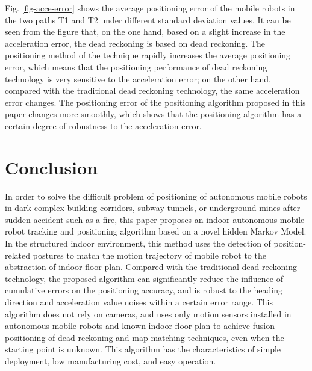 \documentclass{llncs}
\begin{document}
Fig. \ref{fig-acce-error} shows the average positioning error of the mobile robots in the two paths T1 and T2 under different standard deviation values. It can be seen from the figure that, on the one hand, based on a slight increase in the acceleration error, the dead reckoning is based on dead reckoning. The positioning method of the technique rapidly increases the average positioning error, which means that the positioning performance of dead reckoning technology is very sensitive to the acceleration error; on the other hand, compared with the traditional dead reckoning technology, the same acceleration error changes. The positioning error of the positioning algorithm proposed in this paper changes more smoothly, which shows that the positioning algorithm has a certain degree of robustness to the acceleration error.
 

\section{Conclusion}

In order to solve the difficult problem of positioning of autonomous mobile robots in dark complex building corridors, subway tunnels, or underground mines after sudden accident such as a fire, this paper proposes an indoor autonomous mobile robot tracking and positioning algorithm based on a novel hidden Markov Model. In the structured indoor environment, this method uses the detection of position-related postures to match the motion trajectory of mobile robot to the abstraction of indoor floor plan. Compared with the traditional dead reckoning technology, the proposed algorithm can significantly reduce the influence of cumulative errors on the positioning accuracy, and is robust to the heading direction and acceleration value noises within a certain error range. This algorithm does not rely on cameras, and uses only motion sensors installed in autonomous mobile robots and known indoor floor plan to achieve fusion positioning of dead reckoning and map matching techniques, even when the starting point is unknown. This algorithm has the characteristics of simple deployment, low manufacturing cost, and easy operation.

%
%

%
%
%

\end{document}
